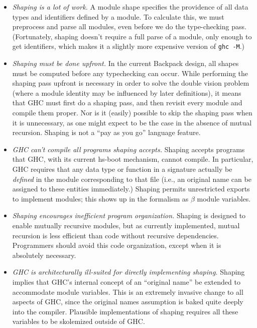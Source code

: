 \documentclass{article}
\begin{document}
\begin{itemize}

    \item \emph{Shaping is a lot of work.} A module shape specifies the
        providence of all data types and identifiers defined by a
        module. To calculate this, we must preprocess and parse all
        modules, even before we do the type-checking pass.  (Fortunately,
        shaping doesn't require a full parse of a module, only enough
        to get identifiers, which makes it a slightly more expensive
        version of \verb|ghc -M|.)

    \item \emph{Shaping must be done upfront.} In the current Backpack
        design, all shapes must be computed before any typechecking can
        occur.  While performing the shaping pass upfront is necessary
        in order to solve the double vision problem (where a module
        identity may be influenced by later definitions), it means
        that GHC must first do a shaping pass, and then revisit every module and
        compile them proper.  Nor is it (easily) possible to skip the
        shaping pass when it is unnecessary, as one might expect to be
        the case in the absence of mutual recursion.  Shaping is not
        a ``pay as you go'' language feature.

    \item \emph{GHC can't compile all programs shaping accepts.}  Shaping
        accepts programs that GHC, with its current hs-boot mechanism, cannot
        compile.  In particular, GHC requires that any data type or function
        in a signature actually be \emph{defined} in the module corresponding
        to that file (i.e., an original name can be assigned to these entities
        immediately.)  Shaping permits unrestricted exports to implement
        modules; this shows up in the formalism as $\beta$ module variables.

    \item \emph{Shaping encourages inefficient program organization.}
        Shaping is designed to enable mutually recursive modules, but as
        currently implemented, mutual recursion is less efficient than
        code without recursive dependencies. Programmers should avoid
        this code organization, except when it is absolutely necessary.

    \item \emph{GHC is architecturally ill-suited for directly
        implementing shaping.}  Shaping implies that GHC's internal
        concept of an ``original name'' be extended to accommodate
        module variables.  This is an extremely invasive change to all
        aspects of GHC, since the original names assumption is baked
        quite deeply into the compiler.  Plausible implementations of
        shaping requires all these variables to be skolemized outside
        of GHC\@.

\end{itemize}
\end{document}
